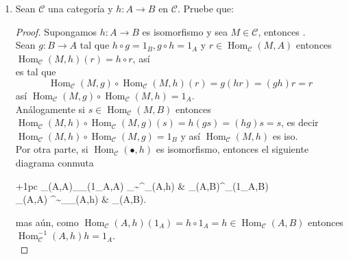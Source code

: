 \documentclass{article}
\begin{document}
\begin{enumerate}[label=\textbf{Ej \arabic*.}]
\begin{proof}
		 Se demuestra en forma análoga a ($a$).\\
		\end{proof}		
		\item Sean $\mathscr{C}$ una categoría y $h:A\to B$ en $\mathscr{C}$. Pruebe que: \\
		\centerline{
		}
		\begin{proof}
			Supongamos $h:A\to B$ es isomorfismo y sea $M\in \mathscr{C}$, entonces 
			. \\Sean $g: B\to A$ tal que $h\circ g=1_B, g\circ h=1_A$ y $r\in \operatorname{Hom}_{\mathscr{C}}(M,A)$
			entonces \\$\operatorname{Hom}_{\mathscr{C}}(M,h)(r)=h\circ r$, así 
			 \\es tal que 
			\[ \operatorname{Hom}_{\mathscr{C}}(M,g)\circ\operatorname{Hom}_{\mathscr{C}}(M,h)(r)=g(hr)=(gh)r=r
			\]
			así $\operatorname{Hom}_{\mathscr{C}}(M,g)\circ\operatorname{Hom}_{\mathscr{C}}(M,h)=1_A$.\\
			
			Análogamente si $s\in \operatorname{Hom}_{\mathscr{C}}(M,B)$ entonces \\
			$\operatorname{Hom}_{\mathscr{C}}(M,h)\circ\operatorname{Hom}_{\mathscr{C}}(M,g)(s)=h(gs)=(hg)s=s$, es decir\\
			$\operatorname{Hom}_{\mathscr{C}}(M,h)\circ\operatorname{Hom}_{\mathscr{C}}(M,g)=1_B$ y así $\operatorname{Hom}_{\mathscr{C}}(M,h)$ es iso.
			\\
			
			Por otra parte, si $\operatorname{Hom}_{\mathscr{C}}(\bullet,h)$ es isomorfismo, entonces el siguiente diagrama conmuta\\
			\centerline{
				\xymatrix@C+1pc{
					_{}(A,A)\ar[d]_{_{}(1_A,A)}
					\ar[r]_{\sim}^{_{}(A,h)} &
					_{}(A,B)\ar[d]^{_{}(1_A,B)}\\
					_{}(A,A)
					\ar[r]^{\sim}_{_{}(A,h)} & _{}(A,B).
				}
			}
			mas aún, como $\operatorname{Hom}_{\mathscr{C}}(A,h)(1_A)=h\circ 1_A=h\in \operatorname{Hom}_{\mathscr{C}}(A,B)$ entonces
			$\operatorname{Hom}^{-1}_{\mathscr{C}}(A,h) h=1_A$.\\
			

\end{proof}
\end{enumerate}
\end{document}
